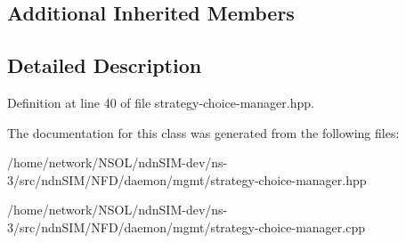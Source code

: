 \subsection*{Additional Inherited Members}


\subsection{Detailed Description}


Definition at line 40 of file strategy-\/choice-\/manager.\+hpp.



The documentation for this class was generated from the following files\+:\begin{DoxyCompactItemize}
\item 
/home/network/\+N\+S\+O\+L/ndn\+S\+I\+M-\/dev/ns-\/3/src/ndn\+S\+I\+M/\+N\+F\+D/daemon/mgmt/strategy-\/choice-\/manager.\+hpp\item 
/home/network/\+N\+S\+O\+L/ndn\+S\+I\+M-\/dev/ns-\/3/src/ndn\+S\+I\+M/\+N\+F\+D/daemon/mgmt/strategy-\/choice-\/manager.\+cpp\end{DoxyCompactItemize}

